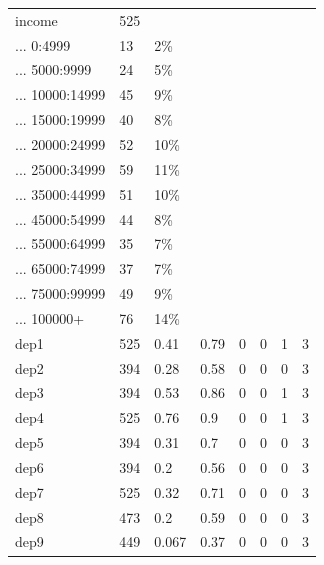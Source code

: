 \documentclass[
]{article}
\begin{document}
\begin{table}
\begin{tabular}[t]{llllllll}
income & 525 &  &  &  &  &  & \\
... 0:4999 & 13 & 2\% &  &  &  &  & \\
... 5000:9999 & 24 & 5\% &  &  &  &  & \\
... 10000:14999 & 45 & 9\% &  &  &  &  & \\
\addlinespace
... 15000:19999 & 40 & 8\% &  &  &  &  & \\
... 20000:24999 & 52 & 10\% &  &  &  &  & \\
... 25000:34999 & 59 & 11\% &  &  &  &  & \\
... 35000:44999 & 51 & 10\% &  &  &  &  & \\
... 45000:54999 & 44 & 8\% &  &  &  &  & \\
\addlinespace
... 55000:64999 & 35 & 7\% &  &  &  &  & \\
... 65000:74999 & 37 & 7\% &  &  &  &  & \\
... 75000:99999 & 49 & 9\% &  &  &  &  & \\
... 100000+ & 76 & 14\% &  &  &  &  & \\
dep1 & 525 & 0.41 & 0.79 & 0 & 0 & 1 & 3\\
\addlinespace
dep2 & 394 & 0.28 & 0.58 & 0 & 0 & 0 & 3\\
dep3 & 394 & 0.53 & 0.86 & 0 & 0 & 1 & 3\\
dep4 & 525 & 0.76 & 0.9 & 0 & 0 & 1 & 3\\
dep5 & 394 & 0.31 & 0.7 & 0 & 0 & 0 & 3\\
dep6 & 394 & 0.2 & 0.56 & 0 & 0 & 0 & 3\\
\addlinespace
dep7 & 525 & 0.32 & 0.71 & 0 & 0 & 0 & 3\\
dep8 & 473 & 0.2 & 0.59 & 0 & 0 & 0 & 3\\
dep9 & 449 & 0.067 & 0.37 & 0 & 0 & 0 & 3\\
\bottomrule
\end{tabular}
\end{table}
\end{document}
